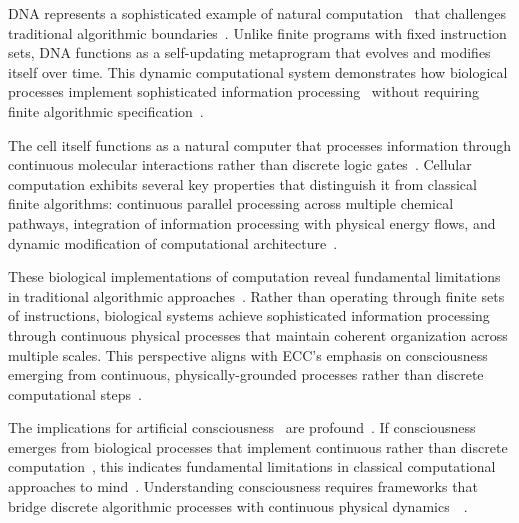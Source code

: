 DNA represents a sophisticated example of natural computation~ that challenges traditional algorithmic boundaries~\cite{Wegner2003,akhlaghpour2022rna,gershman2023molecular}. Unlike finite programs with fixed instruction sets, DNA functions as a self-updating metaprogram that evolves and modifies itself over time. This dynamic computational system demonstrates how biological processes implement sophisticated information processing~ without requiring finite algorithmic specification~\cite{Deutsch2011,lane2010life,kukushkin2024massed}.

The cell itself functions as a natural computer that processes information through continuous molecular interactions rather than discrete logic gates~\cite{Rovelli2018,pellerin2004neuroenergetics,levin2020revisiting}. Cellular computation exhibits several key properties that distinguish it from classical finite algorithms: continuous parallel processing across multiple chemical pathways, integration of information processing with physical energy flows, and dynamic modification of computational architecture~\cite{Aaronson2013,bejan2011constructal,pinotsis2023vivo}.

These biological implementations of computation reveal fundamental limitations in traditional algorithmic approaches~\cite{Copeland2004,ruffini2020realistic,Friston2010}. Rather than operating through finite sets of instructions, biological systems achieve sophisticated information processing through continuous physical processes that maintain coherent organization across multiple scales. This perspective aligns with ECC's emphasis on consciousness emerging from continuous, physically-grounded processes rather than discrete computational steps~\cite{anastassiou2015ephaptic,Beniaguev2021}.

The implications for artificial consciousness~ are profound~\cite{Rogers1987,dennett1992time,frankish2016illusionism}. If consciousness emerges from biological processes that implement continuous rather than discrete computation~, this indicates fundamental limitations in classical computational approaches to mind~. Understanding consciousness requires frameworks that bridge discrete algorithmic processes with continuous physical dynamics~~\cite{chiang2019slow,bosl2025dynamical}.

